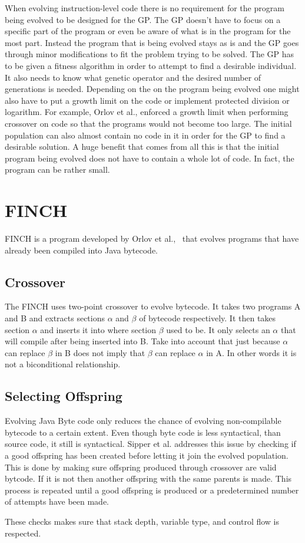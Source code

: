 \documentclass{sig-alternate}
\begin{document}
When evolving instruction-level code there is no requirement for the program being evolved to be designed for the GP. The GP doesn't have to focus on a specific part of the program or even be aware of what is in the program for the most part. Instead the program that is being evolved stays as is and the GP goes through minor modifications to fit the problem trying to be solved. The GP has to be given a fitness algorithm in order to attempt to find a desirable individual. It also needs to know what genetic operator and the desired number of generations is needed. Depending on the on the program being evolved one might also have to put a growth limit on the code or implement protected division or logarithm. For example, Orlov et al., enforced a growth limit when performing crossover on code so that the programs would not become too large. The initial population can also almost contain no code in it in order for the GP to find a desirable solution. 
A huge benefit that comes from all this is that the initial program being evolved does not have to contain a whole lot of code. In fact, the program can be rather small.


\section{FINCH}
FINCH is a program developed by Orlov et al.,~\cite{FINCH2:2009,FINCH:2011} that evolves programs that have already been compiled into Java bytecode.

\subsection{Crossover}

The FINCH uses two-point crossover to evolve bytecode. It takes two programs A and B and extracts sections $\alpha$ and $\beta$ of bytecode respectively. It then takes section $\alpha$ and inserts it into where section $\beta$ used to be. It only selects an $\alpha$ that will compile after being inserted into B. Take into account that just because $\alpha$ can replace $\beta$ in B does not imply that $\beta$ can replace $\alpha$ in A. In other words it is not a biconditional relationship.

\subsection{Selecting Offspring}
Evolving Java Byte code only reduces the chance of evolving non-compilable bytecode to a certain extent. Even though byte code is less syntactical, than source code, it still is syntactical. Sipper et al.\cite{FINCH2:2009} addresses this issue by checking if a good offspring has been created before letting it join the evolved population. This is done by making sure offspring produced through crossover are valid bytcode. If it is not then another offspring with the same parents is made. This process is repeated until a good offspring is produced or a predetermined number of attempts have been made.\par
These checks makes sure that stack depth, variable type, and control flow is respected.
\end{document}
